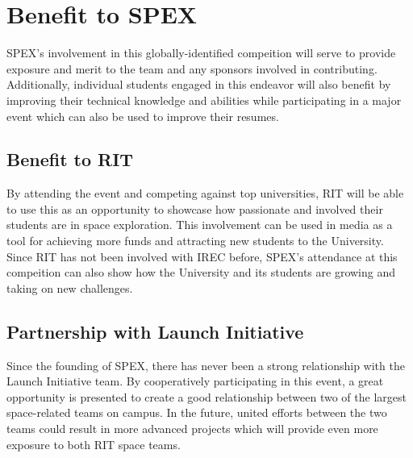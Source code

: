 \documentclass[conference]{IEEEtran} %
\begin{document}
\section{Benefit to SPEX}
\label{sec:Benefit to SPEX}

SPEX's involvement in this globally-identified compeition will serve to provide exposure and merit to the team and any sponsors involved in contributing.
Additionally, individual students engaged in this endeavor will also benefit by improving their technical knowledge and abilities while
participating in a major event which can also be used to improve their resumes.


\subsection{Benefit to RIT}
\label{subsec:Benefit to RIT}
By attending the event and competing against top universities, RIT will be able to use this as an opportunity to showcase
how passionate and involved their students are in space exploration. This involvement can be used in media as a tool for
achieving more funds and attracting new students to the University. Since RIT has not been involved with IREC before, SPEX's attendance at
this compeition can also show how the University and its students are growing and taking on new challenges.

\subsection{Partnership with Launch Initiative}
\label{subsec:Partnership with Launch Initiative}
Since the founding of SPEX, there has never been a strong relationship with the Launch Initiative team. By cooperatively participating
in this event, a great opportunity is presented to create a good relationship between two of the largest space-related teams on
campus. In the future, united efforts between the two teams could result in more advanced projects which will provide
even more exposure to both RIT space teams.
\end{document}
